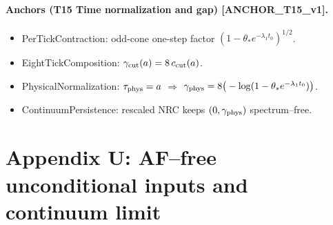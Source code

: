 \documentclass[11pt]{amsart}
\theoremstyle{plain}
\theoremstyle{definition}
\theoremstyle{remark}
\begin{document}
\paragraph{Anchors (T15 Time normalization and gap) [ANCHOR\_T15\_v1].}
\begin{itemize}
  \item PerTickContraction: odd-cone one-step factor $(1-\theta_* e^{-\lambda_1 t_0})^{1/2}$.
  \item EightTickComposition: $\gamma_{\rm cut}(a)=8\,c_{\rm cut}(a)$.
  \item PhysicalNormalization: $\tau_{\rm phys}=a$ $\Rightarrow$ $\gamma_{\rm phys}=8\big(-\log(1-\theta_* e^{-\lambda_1 t_0})\big)$.
  \item ContinuumPersistence: rescaled NRC keeps $(0,\gamma_{\rm phys})$ spectrum–free.
\end{itemize}

\medskip

\section{Appendix U: AF–free unconditional inputs and continuum limit}
\end{document}
